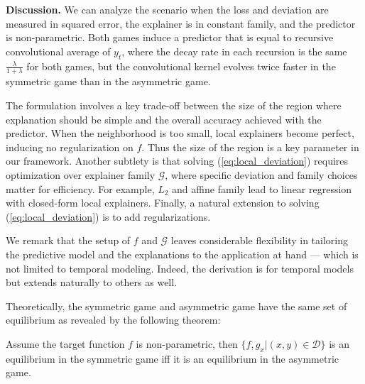 {\bf Discussion.}
We can analyze the scenario when the loss and deviation are measured in squared error, the explainer is in constant family, and the predictor is non-parametric.
Both games induce a predictor that is equal to recursive convolutional average of $y_t$, where the decay rate in each recursion is the same $\frac{\lambda}{1+\lambda}$ for both games, but the convolutional kernel evolves twice faster in the symmetric game than in the asymmetric game. %

The formulation involves a key trade-off between the size of the region where explanation should be simple and the overall accuracy achieved with the predictor. When the neighborhood is too small, local explainers become perfect, inducing no regularization on $f$. Thus the size of the region is a key parameter in our framework. Another subtlety is that solving (\ref{eq:local_deviation}) requires optimization over explainer family $\mathcal{G}$, where specific deviation and family choices matter for efficiency. For example, $L_2$ and affine family lead to linear regression with closed-form local explainers. Finally, a natural extension to solving (\ref{eq:local_deviation}) is to add regularizations. 

We remark that the setup of $f$ and $\mathcal{G}$ leaves considerable flexibility in tailoring the predictive model and the explanations to the application at hand --- which is not limited to temporal modeling. Indeed, the derivation is for temporal models but extends naturally to others as well. 



  Theoretically, the symmetric game and asymmetric game have the same set of equilibrium as revealed by the following theorem:
  \begin{theorem}
  \label{popular}
  Assume the target function $f$ is non-parametric, then $\{f, g_x| (x, y) \in \mathcal{D}\}$ is an equilibrium in the symmetric game iff it is an equilibrium in the asymmetric game.
  \end{theorem}

